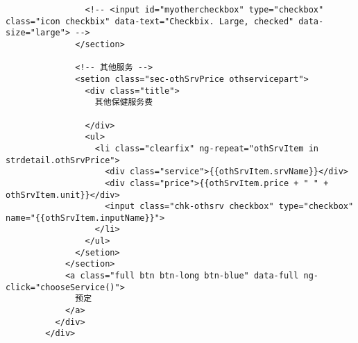 \begin{lstlisting}
                <!-- <input id="myothercheckbox" type="checkbox" class="icon checkbix" data-text="Checkbix. Large, checked" data-size="large"> -->
              </section>

              <!-- 其他服务 -->
              <setion class="sec-othSrvPrice othservicepart">
                <div class="title">
                  其他保健服务费

                </div>
                <ul>
                  <li class="clearfix" ng-repeat="othSrvItem in strdetail.othSrvPrice">
                    <div class="service">{{othSrvItem.srvName}}</div>
                    <div class="price">{{othSrvItem.price + " " + othSrvItem.unit}}</div>
                    <input class="chk-othsrv checkbox" type="checkbox" name="{{othSrvItem.inputName}}">
                  </li>
                </ul>
              </setion>
            </section>
            <a class="full btn btn-long btn-blue" data-full ng-click="chooseService()">
              预定
            </a>
          </div>
        </div>
      \end{lstlisting}

